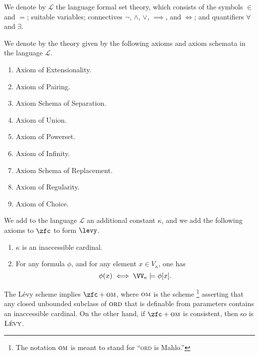 \begin{notation}%
\label{ntn:ZFC}
	We denote by $\mathscr{L}$ the language formal set theory,
	which consists of the symbols $\in$ and $=$; suitable variables; connectives $\neg$, $\wedge$, $\vee$, $\implies$, and $\iff$; and quantifiers $\forall$ and $\exists$.

	We denote by \zfc the theory given by the following axioms and axiom schemata in the language $\mathscr{L}$.
	\begin{enumerate}
		\item Axiom of Extensionality.\citep[p. 4]{Jech2003}
		\item Axiom of Pairing.\citep[p. 6]{Jech2003}
		\item Axiom Schema of Separation.\citep[p. 7]{Jech2003}
		\item Axiom of Union.\citep[p. 9]{Jech2003}
		\item Axiom of Powerset.\citep[p. 9]{Jech2003}
		\item Axiom of Infinity.\citep[p. 12]{Jech2003}
		\item Axiom Schema of Replacement.\citep[p. 13]{Jech2003}
		\item Axiom of Regularity.\citep[p. 63]{Jech2003}
		\item Axiom of Choice.\citep[p. 47]{Jech2003}
	\end{enumerate}
\end{notation}


\begin{axiom}%
\label{axm:Levy}
	We add to the language $\mathscr{L}$ an additional constant $\kappa$,
	and we add the following axioms to $\zfc$ to form  $\levy$.
	\begin{enumerate}
		\item $\kappa$ is an inaccessible cardinal.
		\item {} For any formula $\phi$, and for any element $x\in V_{\kappa}$, one has
		\[
			\phi(x)\iff \VV_{\kappa}\models\phi[x].
		\]
	\end{enumerate}
\end{axiom}

The Lévy scheme implies $\zfc+\textsc{om}$, where $\textsc{om}$ is the scheme%
\footnote{The notation $\textsc{om}$ is meant to stand for \enquote{\textsc{ord} is Mahlo.}}
asserting that any closed unbounded subclass of $\textsc{ord}$ that is definable from parameters contains an inaccessible cardinal.
On the other hand, if $\zfc+\textsc{om}$ is consistent, then so is $\textsc{Lévy}$.

